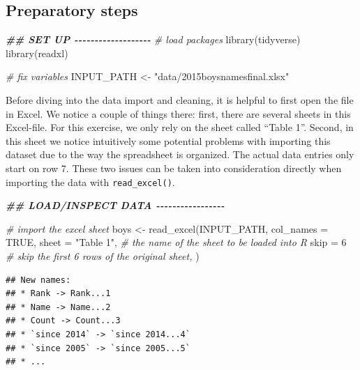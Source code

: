 \documentclass[
  12pt,
]{style/krantz}
\newenvironment{Shaded}{\begin{snugshade}}{\end{snugshade}}
\newcommand{\AttributeTok}[1]{\textcolor[rgb]{0.77,0.63,0.00}{#1}}
\newcommand{\CommentTok}[1]{\textcolor[rgb]{0.56,0.35,0.01}{\textit{#1}}}
\newcommand{\ConstantTok}[1]{\textcolor[rgb]{0.00,0.00,0.00}{#1}}
\newcommand{\DecValTok}[1]{\textcolor[rgb]{0.00,0.00,0.81}{#1}}
\newcommand{\DocumentationTok}[1]{\textcolor[rgb]{0.56,0.35,0.01}{\textbf{\textit{#1}}}}
\newcommand{\FunctionTok}[1]{\textcolor[rgb]{0.00,0.00,0.00}{#1}}
\newcommand{\NormalTok}[1]{#1}
\newcommand{\OtherTok}[1]{\textcolor[rgb]{0.56,0.35,0.01}{#1}}
\newcommand{\StringTok}[1]{\textcolor[rgb]{0.31,0.60,0.02}{#1}}
\begin{document}
\hypertarget{preparatory-steps}{%
\subsection{Preparatory steps}\label{preparatory-steps}}

\begin{Shaded}
\begin{Highlighting}[]
\DocumentationTok{\#\# SET UP {-}{-}{-}{-}{-}{-}{-}{-}{-}{-}{-}{-}{-}{-}{-}{-}{-}{-}{-}}
\CommentTok{\# load packages}
\FunctionTok{library}\NormalTok{(tidyverse)}
\FunctionTok{library}\NormalTok{(readxl)}

\CommentTok{\# fix variables}
\NormalTok{INPUT\_PATH }\OtherTok{\textless{}{-}} \StringTok{"data/2015boysnamesfinal.xlsx"}
\end{Highlighting}
\end{Shaded}

Before diving into the data import and cleaning, it is helpful to first open the file in Excel. We notice a couple of things there: first, there are several sheets in this Excel-file. For this exercise, we only rely on the sheet called ``Table 1''. Second, in this sheet we notice intuitively some potential problems with importing this dataset due to the way the spreadsheet is organized. The actual data entries only start on row 7. These two issues can be taken into consideration directly when importing the data with \texttt{read\_excel()}.

\begin{Shaded}
\begin{Highlighting}[]
\DocumentationTok{\#\# LOAD/INSPECT DATA {-}{-}{-}{-}{-}{-}{-}{-}{-}{-}{-}{-}{-}{-}{-}{-}{-}}

\CommentTok{\# import the excel sheet}
\NormalTok{boys }\OtherTok{\textless{}{-}} \FunctionTok{read\_excel}\NormalTok{(INPUT\_PATH, }\AttributeTok{col\_names =} \ConstantTok{TRUE}\NormalTok{,}
                   \AttributeTok{sheet =} \StringTok{"Table 1"}\NormalTok{, }\CommentTok{\# the name of the sheet to be loaded into R}
                   \AttributeTok{skip =} \DecValTok{6} \CommentTok{\# skip the first 6 rows of the original sheet,}
\NormalTok{                   )}
\end{Highlighting}
\end{Shaded}

\begin{verbatim}
## New names:
## * Rank -> Rank...1
## * Name -> Name...2
## * Count -> Count...3
## * `since 2014` -> `since 2014...4`
## * `since 2005` -> `since 2005...5`
## * ...
\end{verbatim}
\end{document}
